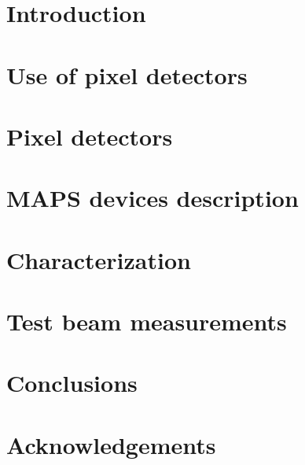 \documentclass[a4paper,11pt]{book}
\begin{document}
 
\pagestyle{fancy}
\renewcommand{\chaptermark}[1]{\markboth{#1}{#1}}
\fancyhead[LEH]{}
\fancyhead[ROH]{}


\frontmatter


\tableofcontents
\chapter*{Introduction}


\mainmatter
\chapter{Use of pixel detectors}\label{chap:usage_of_pixels}


\chapter{Pixel detectors}\label{chap:pixel}


\chapter{MAPS devices description}\label{chap:Monopix_Arcadia}



\chapter{Characterization}


\chapter{Test beam measurements}



\chapter{Conclusions}


\backmatter
\printbibliography[heading=bibintoc, title={Bibliography}]

\chapter*{Acknowledgements}

\end{document}
